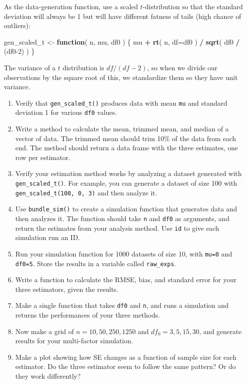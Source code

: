 \documentclass[
]{book}
\newenvironment{Shaded}{\begin{snugshade}}{\end{snugshade}}
\newcommand{\AttributeTok}[1]{\textcolor[rgb]{0.13,0.29,0.53}{#1}}
\newcommand{\ControlFlowTok}[1]{\textcolor[rgb]{0.13,0.29,0.53}{\textbf{#1}}}
\newcommand{\DecValTok}[1]{\textcolor[rgb]{0.00,0.00,0.81}{#1}}
\newcommand{\FunctionTok}[1]{\textcolor[rgb]{0.13,0.29,0.53}{\textbf{#1}}}
\newcommand{\NormalTok}[1]{#1}
\newcommand{\OtherTok}[1]{\textcolor[rgb]{0.56,0.35,0.01}{#1}}
\newcommand{\SpecialCharTok}[1]{\textcolor[rgb]{0.81,0.36,0.00}{\textbf{#1}}}
\begin{document}
As the data-generation function, use a scaled \(t\)-distribution so that the standard deviation will always be 1 but will have different fatness of tails (high chance of outliers):

\begin{Shaded}
\begin{Highlighting}[]
\NormalTok{gen\_scaled\_t }\OtherTok{\textless{}{-}} \ControlFlowTok{function}\NormalTok{( n, mu, df0 ) \{}
\NormalTok{    mu }\SpecialCharTok{+} \FunctionTok{rt}\NormalTok{( n, }\AttributeTok{df=}\NormalTok{df0 ) }\SpecialCharTok{/} \FunctionTok{sqrt}\NormalTok{( df0 }\SpecialCharTok{/}\NormalTok{ (df0}\DecValTok{{-}2}\NormalTok{) )}
\NormalTok{\}}
\end{Highlighting}
\end{Shaded}

The variance of a \(t\) distribution is \(df/(df-2)\), so when we divide our observations by the
square root of this, we standardize them so they have unit variance.

\begin{enumerate}
\def\labelenumi{\arabic{enumi}.}
\item
  Verify that \texttt{gen\_scaled\_t()} produces data with mean \texttt{mu} and standard deviation 1 for various \texttt{df0} values.
\item
  Write a method to calculate the mean, trimmed mean, and median of a vector of data.
  The trimmed mean should trim 10\% of the data from each end.
  The method should return a data frame with the three estimates, one row per estimator.
\item
  Verify your estimation method works by analyzing a dataset generated with \texttt{gen\_scaled\_t()}.
  For example, you can generate a dataset of size 100 with \texttt{gen\_scaled\_t(100,\ 0,\ 3)} and then analyze it.
\item
  Use \texttt{bundle\_sim()} to create a simulation function that generates data and then analyzes it.
  The function should take \texttt{n} and \texttt{df0} as arguments, and return the estimates from your analysis method.
  Use \texttt{id} to give each simulation run an ID.
\item
  Run your simulation function for 1000 datasets of size 10, with \texttt{mu=0} and \texttt{df0=5}.
  Store the results in a variable called \texttt{raw\_exps}.
\item
  Write a function to calculate the RMSE, bias, and standard error for your three estimators, given the results.
\item
  Make a single function that takes \texttt{df0} and \texttt{n}, and runs a simulation and returns the performances of your three methods.
\item
  Now make a grid of \(n = 10, 50, 250, 1250\) and \(df_0 =  3, 5, 15, 30\), and generate results for your multi-factor simulation.
\item
  Make a plot showing how SE changes as a function of sample size for each estimator. Do the three estimator seem to follow the same pattern? Or do they work differently?
\end{enumerate}
\end{document}
